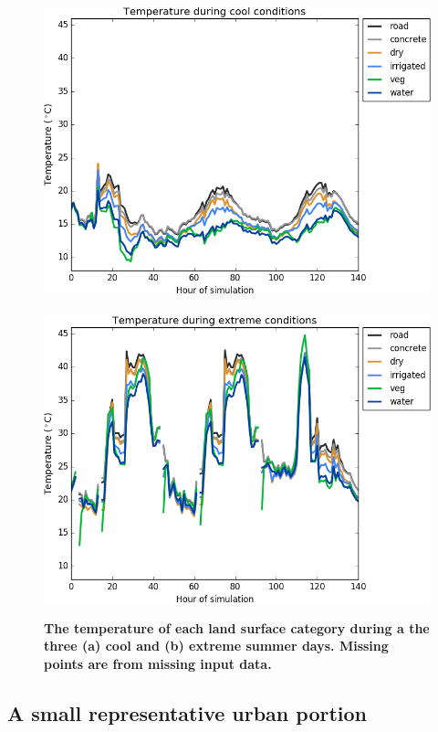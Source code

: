 \documentclass[final,3p,times,authoryear]{elsarticle}
\begin{document}
\begin{figure}[!htbp]
\centering   
\includegraphics[scale=0.40]{images/fig1a}
~
\includegraphics[scale=0.40]{images/fig1b} 
\caption{\bf The temperature of each land surface category during a the three (a) cool and (b) extreme summer days. Missing points are from missing input data.}    
 \label{fig:fig1} 
\end{figure} 




\subsection{A small representative urban portion}\label{sec:4}
\end{document}
